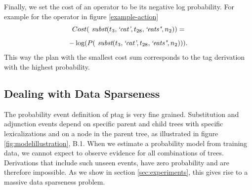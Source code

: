 Finally, we set the cost of an operator to be its negative log probability. For example for the operator in figure \ref{example-action} $$Cost( \textit{ subst}(t_3,\textit{`cat'},t_{28},\textit{`eats"},n_2) ) =$$
$$ -\log( P(\textit{ subst}(t_3,\textit{`cat'},t_{28},\textit{`eats"},n_2)) ). $$ This way the plan with the smallest cost sum corresponds to the {\sc tag} derivation with the highest probability. 

\subsection{Dealing with Data Sparseness}
\label{ssec:sparseness}
The probability event definition of {\sc ptag} is very fine grained. Substitution and adjunction events depend on specific parent and child trees with specific lexicalizations and on a node in the parent tree, as illustrated in figure \ref{fig:modelillustration}, B.1. When we estimate a probability model from training data, we cannot expect to observe evidence for all combinations of trees. Derivations that include such unseen events, have zero probability and are therefore impossible. As we show in section \ref{sec:experiments}, this gives rise to a massive data sparseness problem.

